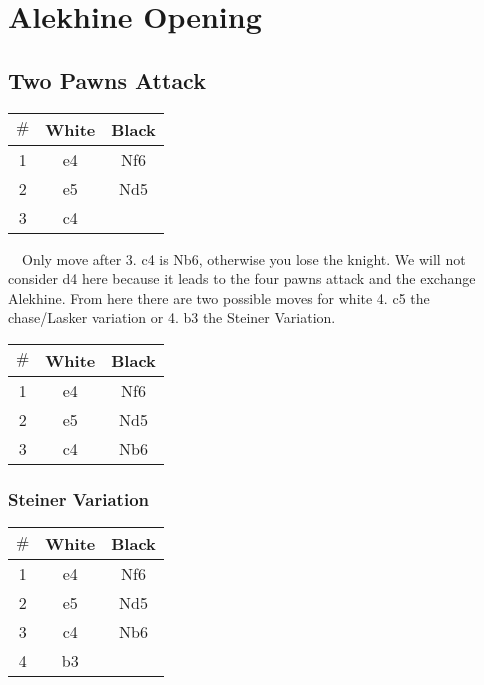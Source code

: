 \documentclass{article}
\newcommand{\tab}{$\quad$}
\newcommand{\smalls}{\par\smallskip}
\newcommand{\biigs}{\par\bigskip}
\begin{document}
\section*{Alekhine Opening}
    \biigs
    \subsection*{Two Pawns Attack}
        \smalls
        \newgame


        \begin{multicols}{2}
        \showboard
        \smalls
        \begin{tabular}{c|c|c}
        $\#$ & White & Black\\
        \hline
        1 & e4 & Nf6 \\
        2 & e5 & Nd5 \\
        3 & c4 & \\
        \end{tabular}
        \end{multicols}
        \tab Only move after 3. c4 is Nb6, otherwise you lose the knight.  We
        will not consider d4 here because it leads to the four pawns attack and
        the exchange Alekhine.  From here there are two possible moves for white
        4. c5 the chase/Lasker variation or 4. b3 the Steiner Variation.
        \smalls

        \begin{multicols}{2}
            \showboard
            \smalls
            \begin{tabular}{c|c|c}
                $\#$ & White & Black\\
                \hline
                1 & e4 & Nf6 \\
                2 & e5 & Nd5 \\
                3 & c4 & Nb6 \\
            \end{tabular}
        \end{multicols}



        \smalls
        \newpage
        \subsubsection*{Steiner Variation}

        \begin{multicols}{2}
            \showboard
            \smalls
            \begin{tabular}{c|c|c}
                $\#$ & White & Black\\
                \hline
                1 & e4 & Nf6 \\
                2 & e5 & Nd5 \\
                3 & c4 & Nb6 \\
                4 & b3 & \\
            \end{tabular}
        \end{multicols}
\end{document}
